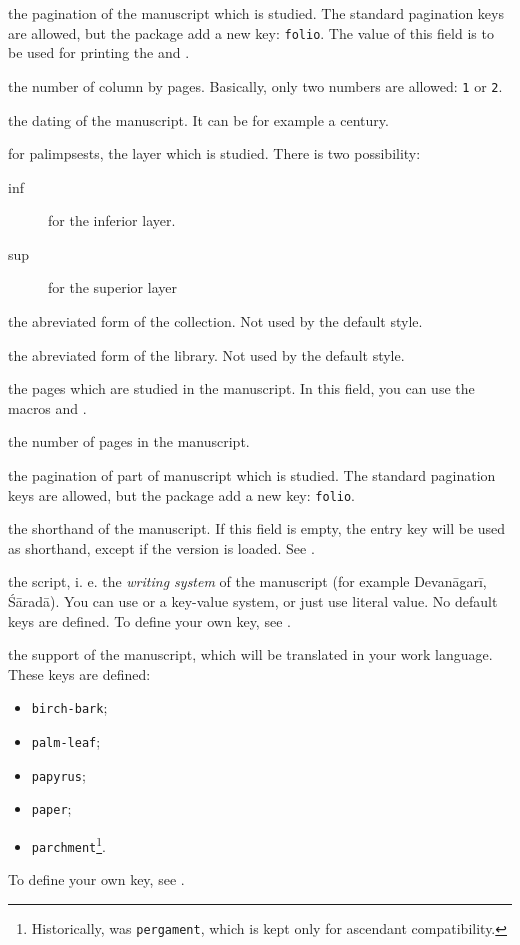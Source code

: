\documentclass{ltxdockit}[2011/03/25]
\begin{document}
\begin{fieldlist}

 the pagination of the manuscript which is studied. The standard pagination keys are allowed, but the package add a new key: \texttt{folio}. The value of this field is to be used for printing the  and .

 the number of column by pages. Basically, only two numbers are allowed: \verb+1+ or \verb+2+.

 the dating of the manuscript. It can be for example a century.

\label{field:layer} for palimpsests, the layer which is studied. There is two possibility: 
	\begin{description}
		\item[inf] for the inferior layer.
		\item[sup] for the superior layer 
	\end{description}

 the abreviated form of the collection. Not used by the default style.\label{field:shortcollection}


 the abreviated form of the library. Not used by the default style.


 the pages which are studied in the manuscript. In this field, you can use the macros  and .

 the number of pages in the manuscript.


 the pagination of part of manuscript which is studied. The standard pagination keys are allowed, but the package add a new key: \verb+folio+.


 the shorthand of the manuscript. If this field is empty, the entry key will be used as shorthand, except if the version  is loaded. See .

 the script, i. e. the \emph{writing system} of the manuscript (for example Devanāgarī, Śāradā).
 You can use or a key-value system, or just use literal value. No default keys are defined.
 To define your own key, see .
 

  the support of the manuscript, which will be translated in your work language. These keys are defined: \begin{itemize}
  \item \texttt{birch-bark};
  \item \texttt{palm-leaf};
  \item \texttt{papyrus};
  \item \texttt{paper};
  \item \texttt{parchment}\footnote{Historically, was \texttt{pergament}, which is kept only for ascendant compatibility.}.
\end{itemize}
 To define your own key, see .
\end{fieldlist}
\end{document}

